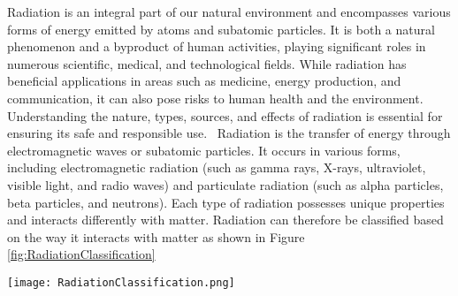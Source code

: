 \documentclass[../introduction.tex]{subfiles}
\begin{document}
    Radiation is an integral part of our natural environment and encompasses various forms of energy emitted by atoms 
    and subatomic particles. It is both a natural phenomenon and a byproduct of human activities, playing significant roles 
    in numerous scientific, medical, and technological fields. While radiation has beneficial applications in areas such as medicine, 
    energy production, and communication, it can also pose risks to human health and the environment. Understanding the nature, types, 
    sources, and effects of radiation is essential for ensuring its safe and responsible use.
    \
    Radiation is the transfer of energy through electromagnetic waves or subatomic particles. It occurs in various forms, 
    including electromagnetic radiation (such as gamma rays, X-rays, ultraviolet, visible light, and radio waves) and 
    particulate radiation (such as alpha particles, beta particles, and neutrons). Each type of radiation possesses unique properties 
    and interacts differently with matter. Radiation can therefore be classified 
    based on the way it interacts with matter as shown in Figure \ref{fig:RadiationClassification}

    \begin{Figure}
        \centering
        \texttt{[image: RadiationClassification.png]}
        \label{fig:RadiationClassification}
    \end{Figure}
\end{document}
